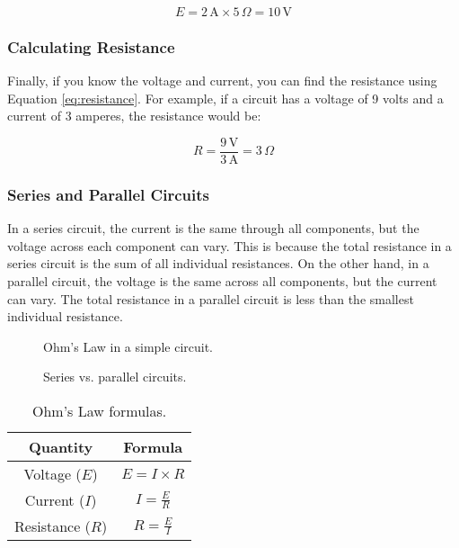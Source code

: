 \[
E = 2\,\text{A} \times 5\,\Omega = 10\,\text{V}
\]

\subsubsection*{Calculating Resistance}
Finally, if you know the voltage and current, you can find the resistance using Equation \ref{eq:resistance}. For example, if a circuit has a voltage of 9 volts and a current of 3 amperes, the resistance would be:

\[
R = \frac{9\,\text{V}}{3\,\text{A}} = 3\,\Omega
\]

\subsubsection*{Series and Parallel Circuits}
In a series circuit, the current is the same through all components, but the voltage across each component can vary. This is because the total resistance in a series circuit is the sum of all individual resistances. On the other hand, in a parallel circuit, the voltage is the same across all components, but the current can vary. The total resistance in a parallel circuit is less than the smallest individual resistance.

\begin{figure}[h!]
    \centering
    \caption{Ohm's Law in a simple circuit.}
    \label{fig:ohms-law}
\end{figure}

\begin{figure}[h!]
    \centering
    \caption{Series vs. parallel circuits.}
    \label{fig:series-parallel}
\end{figure}

\begin{table}[h!]
    \centering
    \begin{tabular}{|c|c|}
        \hline
        \textbf{Quantity} & \textbf{Formula} \\
        \hline
        Voltage (\(E\)) & \(E = I \times R\) \\
        Current (\(I\)) & \(I = \frac{E}{R}\) \\
        Resistance (\(R\)) & \(R = \frac{E}{I}\) \\
        \hline
    \end{tabular}
    \caption{Ohm's Law formulas.}
    \label{tab:ohms-law-formulas}
\end{table}

